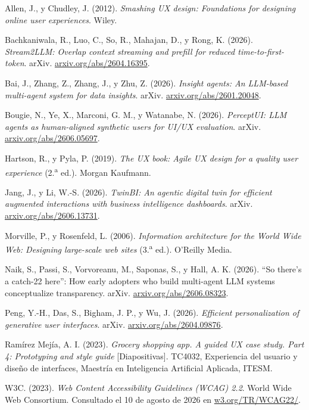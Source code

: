 \begin{uxreferencias}
Allen, J., y Chudley, J. (2012). \textit{Smashing UX design: Foundations for designing online
user experiences}. Wiley.

Bachkaniwala, R., Luo, C., So, R., Mahajan, D., y Rong, K. (2026). \textit{Stream2LLM: Overlap
context streaming and prefill for reduced time-to-first-token}. arXiv. \href{https://arxiv.org/abs/2604.16395}{arxiv.org/abs/2604.16395}.

Bai, J., Zhang, Z., Zhang, J., y Zhu, Z. (2026). \textit{Insight agents: An LLM-based
multi-agent system for data insights}. arXiv. \href{https://arxiv.org/abs/2601.20048}{arxiv.org/abs/2601.20048}.

Bougie, N., Ye, X., Marconi, G. M., y Watanabe, N. (2026). \textit{PerceptUI: LLM agents as
human-aligned synthetic users for UI/UX evaluation}. arXiv. \href{https://arxiv.org/abs/2606.05697}{arxiv.org/abs/2606.05697}.

Hartson, R., y Pyla, P. (2019). \textit{The UX book: Agile UX design for a quality user
experience} (2.\textsuperscript{a} ed.). Morgan Kaufmann.

Jang, J., y Li, W.-S. (2026). \textit{TwinBI: An agentic digital twin for efficient augmented
interactions with business intelligence dashboards}. arXiv. \href{https://arxiv.org/abs/2606.13731}{arxiv.org/abs/2606.13731}.

Morville, P., y Rosenfeld, L. (2006). \textit{Information architecture for the World Wide Web:
Designing large-scale web sites} (3.\textsuperscript{a} ed.). O'Reilly Media.

Naik, S., Passi, S., Vorvoreanu, M., Saponas, S., y Hall, A. K. (2026). \enquote{So there's a
catch-22 here}: How early adopters who build multi-agent LLM systems conceptualize transparency.
arXiv. \href{https://arxiv.org/abs/2606.08323}{arxiv.org/abs/2606.08323}.

Peng, Y.-H., Das, S., Bigham, J. P., y Wu, J. (2026). \textit{Efficient personalization of
generative user interfaces}. arXiv. \href{https://arxiv.org/abs/2604.09876}{arxiv.org/abs/2604.09876}.

Ramírez Mejía, A. I. (2023). \textit{Grocery shopping app. A guided UX case study. Part 4:
Prototyping and style guide} [Diapositivas]. TC4032, Experiencia del usuario y diseño de
interfaces, Maestría en Inteligencia Artificial Aplicada, ITESM.

W3C. (2023). \textit{Web Content Accessibility Guidelines (WCAG) 2.2}. World Wide Web
Consortium. Consultado el 10 de agosto de 2026 en \href{https://www.w3.org/TR/WCAG22/}{w3.org/TR/WCAG22/}.
\end{uxreferencias}
